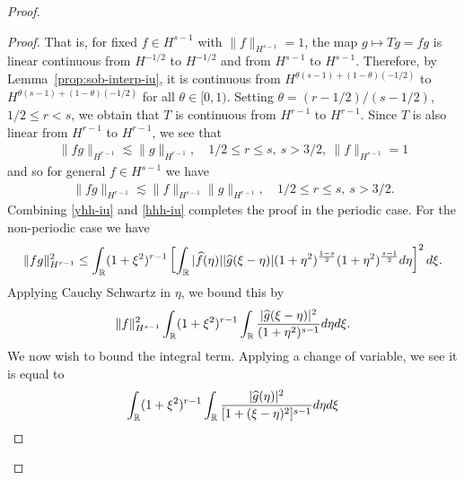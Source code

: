 \begin{proof}
\begin{proof}
%
%
That is, for fixed $f \in H^{s-1}$ with $\| f \|_{H^{s-1}} =1$, the map $g \mapsto
Tg = fg$ is linear continuous from $H^{-1/2}$ to $H^{-1/2}$ and from $H^{s-1}$ to
$H^{s-1}$. Therefore, by Lemma~\ref{prop:sob-interp-iu}, it is continuous from
$H^{\theta (s-1) + (1 - \theta)(-1/2) }$ to $H^{\theta (s-1) + (1 - \theta)(-1/2) }$ for all $\theta \in
[0, 1)$. Setting $\theta = (r-1/2)/(s-1/2)$, $ 1/2 \le r < s$, we obtain that $T$ is
continuous from $H^{r-1}$ to $H^{r-1}$. Since $T$ is also linear from $H^{r-1}$
to $H^{r-1}$, we see that 
%
%
\begin{equation*}
\begin{split}
\| f g \|_{H^{r-1}} \lesssim \| g \|_{H^{r-1}}, \quad 1/2 \le r \le s, \ s > 3/2, \ \| f \|_{H^{s-1}} =1
\end{split}
\end{equation*}
and so for general $f \in H^{s-1}$ we have 
%
\begin{equation}
\label{hhh-iu}
\begin{split}
\| f g \|_{H^{r-1}} \lesssim \|f \|_{H^{s-1}}
\| g \|_{H^{r-1}}, \quad 1/2 \le r \le s, \ s > 3/2. 
\end{split}
\end{equation}
%
Combining \eqref{yhh-iu} and \eqref{hhh-iu} completes the proof in the periodic
case. For the non-periodic case we have
%
%
\begin{equation*}
\begin{split}
\| fg\|_{H^{r-1}}^{2}
\le \int_{\mathbb{R}}  (1 + \xi^{2})^{r-1}\left [ \int_{\mathbb{R}}
| \widehat{f}(\eta) |  | \widehat{g}(\xi - \eta) | (1 +
\eta^{2})^{\frac{1-s}{2}} (1 + \eta^{2})^{\frac{s-1}{2}}
d \eta \right ]^{2} d \xi.
\end{split}
\end{equation*}
%
Applying Cauchy Schwartz in $\eta$, we bound this by
%
%
%
\begin{equation*}
\begin{split}
\| f \|_{H^{s-1}}^{2} \int_{\mathbb{R}}  (1 + \xi^{2})^{r-1}\int_{\mathbb{R}} \frac{|
\widehat{g}(\xi - \eta) |^{2}}{(1 + \eta^{2})^{s-1}} d \eta d \xi.
\end{split}
\end{equation*}
%
We now wish to bound the integral term. Applying a change of variable, we see it
is equal to
%
\begin{equation*}
\begin{split}
\int_{\mathbb{R}} (1 + \xi^{2})^{r-1} \int_{\mathbb{R}}
\frac{| \widehat{g}(\eta) |^{2}}{[1 + (\xi - \eta)^{2}]^{s-1}} d \eta d \xi
\end{split}
\end{equation*}

\end{proof}
\end{proof}
